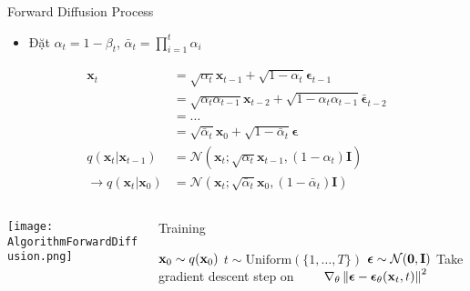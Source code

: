 \begin{frame}{Forward Diffusion Process}
\small
\begin{itemize}[]
	\item Đặt $\alpha_t = 1 - \beta_t$, $\bar{\alpha}_t = \prod_{i=1}^t \alpha_i$
\end{itemize}
\vspace{-15pt}
\begin{align*}
	\mathbf{x}_t & = \sqrt{\alpha_t}\mathbf{x}_{t-1} + \sqrt{1 - \alpha_t} \boldsymbol{\epsilon}_{t-1} \\
						& = \sqrt{\alpha_t \alpha_{t-1}} \mathbf{x}_{t-2} + \sqrt{1 - \alpha_t \alpha_{t-1}} \bar{\boldsymbol{\epsilon}}_{t-2} \\
						& = \dots \\
						& = \sqrt{\bar{\alpha}_t}\mathbf{x}_0 + \sqrt{1 - \bar{\alpha}_t}\boldsymbol{\epsilon} \\
						q(\mathbf{x}_t \vert \mathbf{x}_{t-1}) &= \mathcal{N}(\mathbf{x}_t; \sqrt{\alpha_t} \mathbf{x}_{t-1}, (1 - \alpha_t)\mathbf{I}) \\ 
						\rightarrow q(\mathbf{x}_t \vert \mathbf{x}_0) &= \mathcal{N}(\mathbf{x}_t; \sqrt{\bar{\alpha}_t} \mathbf{x}_0, (1 - \bar{\alpha}_t)\mathbf{I})
\end{align*}
\vspace{-20pt}
	
\begin{columns}
\begin{column}{0.5\textwidth}
	\texttt{[image: AlgorithmForwardDiffusion.png]}
\end{column}


	
\begin{column}{0.5\textwidth}
	\footnotesize
	\begin{algorithm}[H]
		\caption{Training} \label{alg:training}
		\begin{algorithmic}[1]
			\footnotesize
			\Repeat
			\State $\mathbf{x}_0 \sim q(\mathbf{x}_0)$
			\State $t \sim \mathrm{Uniform}(\{1, \dotsc, T\})$
			\State ${\boldsymbol{\epsilon}}\sim\mathcal{N}(\mathbf{0},\mathbf{I})$
			\State Take gradient descent step on
			\Statex $\qquad \nabla_\theta \left\| {\boldsymbol{\epsilon}} - {\boldsymbol{\epsilon}}_\theta(\mathbf{x}_t, t) \right\|^2$
		\end{algorithmic}
	\end{algorithm}
\end{column}
\end{columns}
\end{frame}

